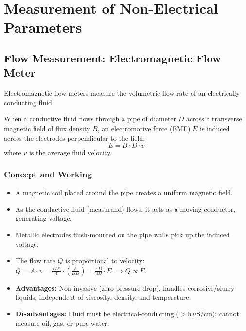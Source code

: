 \documentclass[12pt,a4paper]{article}
\begin{document}
\section{Measurement of Non-Electrical Parameters}

\subsection{Flow Measurement: Electromagnetic Flow Meter}
Electromagnetic flow meters measure the volumetric flow rate of an electrically conducting fluid.

\begin{tcolorbox}[defbox, title={\textbf{Working Principle (Faraday's Law)}}]
When a conductive fluid flows through a pipe of diameter $D$ across a transverse magnetic field of flux density $B$, an electromotive force (EMF) $E$ is induced across the electrodes perpendicular to the field:
\begin{equation}
  E = B \cdot D \cdot v
\end{equation}
where $v$ is the average fluid velocity.
\end{tcolorbox}

\subsubsection{Concept and Working}
\begin{itemize}[leftmargin=*, itemsep=3pt]
  \item A magnetic coil placed around the pipe creates a uniform magnetic field.
  \item As the conductive fluid (measurand) flows, it acts as a moving conductor, generating voltage.
  \item Metallic electrodes flush-mounted on the pipe walls pick up the induced voltage.
  \item The flow rate $Q$ is proportional to velocity: $Q = A \cdot v = \frac{\pi D^2}{4} \cdot \left(\frac{E}{B D}\right) = \frac{\pi D}{4 B} \cdot E \implies Q \propto E$.
\end{itemize}
\begin{itemize}[leftmargin=*, itemsep=3pt]
  \item \textbf{Advantages:} Non-invasive (zero pressure drop), handles corrosive/slurry liquids, independent of viscosity, density, and temperature.
  \item \textbf{Disadvantages:} Fluid must be electrical-conducting ($> 5\,\mu\text{S/cm}$); cannot measure oil, gas, or pure water.
\end{itemize}
\end{document}
